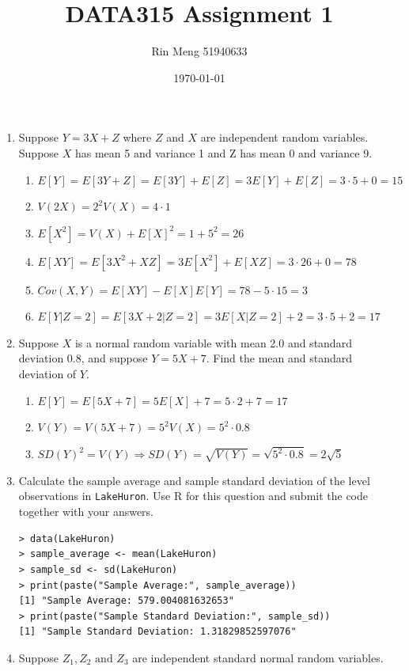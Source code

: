 \documentclass[12pt]{article}
\title{DATA315 Assignment 1}
\author{Rin Meng 51940633}
\date{\today}
\begin{document}
\maketitle

\begin{enumerate}
    \item Suppose $Y = 3X + Z$ where $Z$ and $X$ are independent random variables. Suppose $X$
    has mean 5 and variance 1 and Z has mean 0 and variance 9.
    \begin{enumerate} 
        \item $E[Y] = E[3Y + Z] = E[3Y] + E[Z] = 3E[Y] + E[Z] = 3 \cdot 5 + 0 = 15$
        \item $V(2X) = 2^2V(X) = 4 \cdot 1$
        \item $E[X^2] = V(X) + E[X]^2 = 1 + 5^2 = 26$
        \item $E[XY] = E[3X^2 + XZ] = 3E[X^2] + E[XZ] = 3 \cdot 26 + 0 = 78$
        \item $Cov(X, Y) = E[XY] - E[X]E[Y] = 78 - 5 \cdot 15 = 3$
        \item $E[Y | Z = 2] = E[3X + 2 | Z = 2] = 3E[X | Z = 2] + 2 = 3 \cdot 5 + 2 = 17$
    \end{enumerate}
    \item Suppose $X$ is a normal random variable with mean 2.0 and standard deviation
    0.8, and suppose $Y = 5X + 7$. Find the mean and standard deviation of $Y$.
    \begin{enumerate}
        \item $E[Y] = E[5X + 7] = 5E[X] + 7 = 5 \cdot 2 + 7 = 17$
        \item $V(Y) = V(5X + 7) = 5^2V(X) = 5^2 \cdot 0.8$
        \item $SD(Y)^2 = V(Y) \Rightarrow SD(Y) = \sqrt{V(Y)} = \sqrt{5^2 \cdot 0.8} = 2\sqrt{5}$
    \end{enumerate}
    \item Calculate the sample average and sample standard deviation of the level
    observations in \verb|LakeHuron|. Use R for this question and submit the code together with
    your answers.
    \begin{verbatim}
> data(LakeHuron)
> sample_average <- mean(LakeHuron)
> sample_sd <- sd(LakeHuron)
> print(paste("Sample Average:", sample_average))
[1] "Sample Average: 579.004081632653"
> print(paste("Sample Standard Deviation:", sample_sd))
[1] "Sample Standard Deviation: 1.31829852597076"
    \end{verbatim}
    \item  Suppose $Z_1, Z_2 \text{ and } Z_3$ are independent standard normal random variables.

\end{enumerate}
\end{document}
